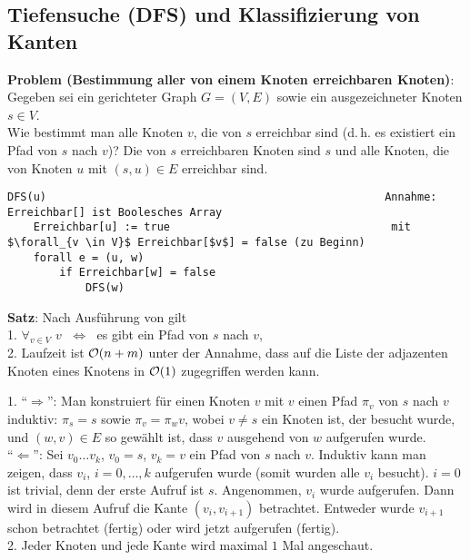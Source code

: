 \subsection{%
    Tiefensuche (DFS) und Klassifizierung von Kanten%
}

\textbf{Problem (Bestimmung aller von einem Knoten erreichbaren Knoten)}: \\
Gegeben sei ein gerichteter Graph $G = (V, E)$ sowie ein ausgezeichneter Knoten
$s \in V$. \\
Wie bestimmt man alle Knoten $v$, die von $s$ erreichbar sind 
(d.\,h. es existiert ein Pfad von $s$ nach $v$)?
Die von $s$ erreichbaren Knoten sind $s$ und alle Knoten, die von
Knoten $u$ mit $(s, u) \in E$ erreichbar sind.

\begin{lstlisting}
DFS(u)                                                    Annahme: Erreichbar[] ist Boolesches Array
    Erreichbar[u] := true                                  mit $\forall_{v \in V}$ Erreichbar[$v$] = false (zu Beginn)
    forall e = (u, w)
        if Erreichbar[w] = false
            DFS(w)
\end{lstlisting}

\textbf{Satz}: Nach Ausführung von  gilt \\
1. $\forall_{v \in V}$ \code{Erreichbar[}$v$\code{] = true}
$\;\Leftrightarrow\;$ es gibt ein Pfad von $s$ nach $v$, \\
2. Laufzeit ist $\mathcal{O}(n + m)$ unter der Annahme, dass auf die Liste der
adjazenten Knoten eines Knotens in $\mathcal{O}(1)$ zugegriffen werden kann.

\begin{Beweis}
    1. "`$\Rightarrow$"':
    Man konstruiert für einen Knoten $v$ mit
    \code{Erreichbar[}$v$\code{] = true}
    einen Pfad $\pi_v$ von $s$ nach $v$ induktiv:
    $\pi_s = s$ sowie $\pi_v = \pi_w v$, wobei $v \not= s$ ein Knoten ist,
    der besucht wurde, und $(w, v) \in E$ so gewählt ist, dass
    $v$\code{)} ausgehend von $w$\code{)} aufgerufen
    wurde. \\
    "`$\Leftarrow$"':
    Sei $v_0 \dotsc v_k$, $v_0 = s$, $v_k = v$ ein Pfad von $s$ nach $v$.
    Induktiv kann man zeigen, dass $v_i$\code{)}, $i = 0, \dotsc, k$
    aufgerufen wurde (somit wurden alle $v_i$ besucht).
    $i = 0$ ist trivial, denn der erste Aufruf ist $s$\code{)}.
    Angenommen, $v_i$\code{)} wurde aufgerufen.
    Dann wird in diesem Aufruf die Kante $(v_i, v_{i+1})$ betrachtet.
    Entweder wurde $v_{i+1}$ schon betrachtet (fertig) oder wird jetzt
    aufgerufen (fertig). \\
    2. Jeder Knoten und jede Kante wird maximal $1$ Mal angeschaut.
\end{Beweis}

